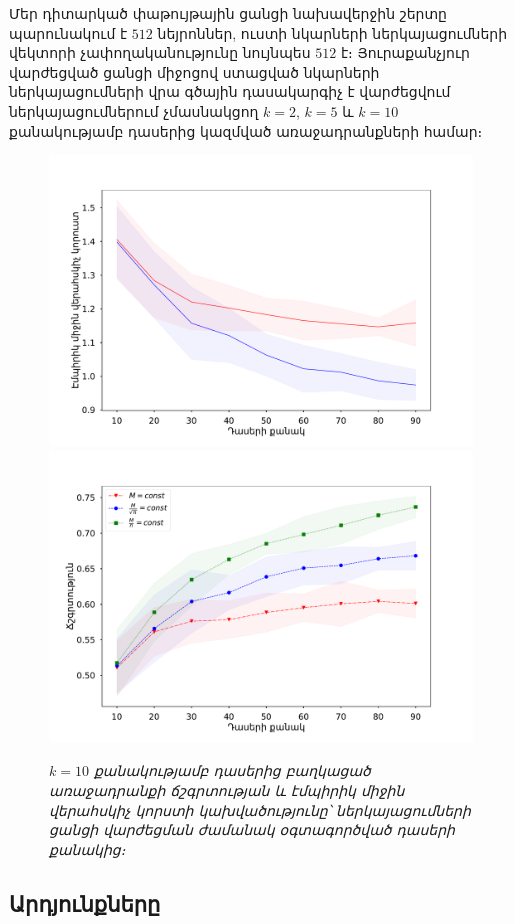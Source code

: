 \documentclass[12pt]{article}
\begin{document}
Մեր դիտարկած փաթույթային ցանցի նախավերջին շերտը պարունակում է $512$ նեյրոններ, ուստի նկարների ներկայացումների վեկտորի չափողականությունը նույնպես $512$ է։ Յուրաքանչյուր վարժեցված  ցանցի միջոցով ստացված նկարների ներկայացումների  վրա գծային դասակարգիչ է վարժեցվում ներկայացումներում չմասնակցող $k=2$, $k=5$ և $k=10$ քանակությամբ դասերից կազմված  առաջադրանքների համար։



\begin{figure}[htp]

\centering
\includegraphics[width=.5\textwidth]{imgs/k=10.pdf}\hfill
\includegraphics[width=.5\textwidth]{imgs/k=10_acc.pdf}\hfill
\caption{\textit{$k=10$ քանակությամբ դասերից բաղկացած առաջադրանքի ճշգրտության և էմպիրիկ միջին վերահսկիչ կորստի կախվածությունը՝ ներկայացումների ցանցի վարժեցման ժամանակ  օգտագործված դասերի քանակից։}}
\label{fig:figure3}

\end{figure}



{}


\subsection*{\hfill Արդյունքները \hfill} \noindent
\end{document}
